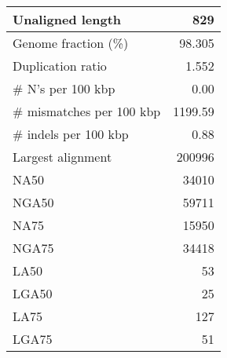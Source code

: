 \documentclass[12pt,a4paper]{article}
\begin{document}
\begin{table}[ht]
\begin{center}
\begin{tabular}{|l*{1}{|r}|}
Unaligned length & 829 \\ \hline
Genome fraction (\%) & 98.305 \\ \hline
Duplication ratio & 1.552 \\ \hline
\# N's per 100 kbp & 0.00 \\ \hline
\# mismatches per 100 kbp & 1199.59 \\ \hline
\# indels per 100 kbp & 0.88 \\ \hline
Largest alignment & 200996 \\ \hline
NA50 & 34010 \\ \hline
NGA50 & 59711 \\ \hline
NA75 & 15950 \\ \hline
NGA75 & 34418 \\ \hline
LA50 & 53 \\ \hline
LGA50 & 25 \\ \hline
LA75 & 127 \\ \hline
LGA75 & 51 \\ \hline
\end{tabular}
\end{center}
\end{table}
\end{document}
